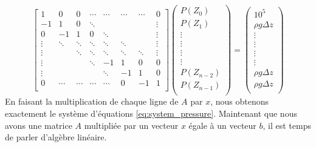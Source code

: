 \begin{equation}
\label{eq:ax_b}
\begin{bmatrix}
   1   &    0   &    0   & \cdots & \cdots & \cdots & \cdots &   0    \\
  -1   &    1   &    0   & \ddots &        &        &        & \vdots \\
   0   &   -1   &    1   &    0   & \ddots &        &        & \vdots \\
\vdots & \ddots & \ddots & \ddots & \ddots & \ddots &        & \vdots \\
\vdots &        & \ddots & \ddots & \ddots & \ddots & \ddots & \vdots \\
\vdots &        &        & \ddots &   -1   &    1   &    0   &   0    \\
\vdots &        &        &        & \ddots &   -1   &    1   &   0    \\
   0   & \cdots & \cdots & \cdots & \cdots &    0   &   -1   &   1    \\
\end{bmatrix}
\begin{pmatrix}
  P(Z_0)  \\
  P(Z_1)  \\
\vdots \\
\vdots \\
\vdots \\
\vdots \\
P(Z_{n-2}) \\
  P(Z_{n-1})  \\
\end{pmatrix}
=
\begin{pmatrix}
 10^5  \\
\rho{}g\Delta{z}     \\
\vdots \\
\vdots \\
\vdots \\
\vdots \\
\rho{}g\Delta{z} \\
\rho{}g\Delta{z}    \\
\end{pmatrix}
\end{equation}
En faisant la multiplication de chaque ligne de $A$ par $x$, nous obtenons exactement le système d'équations \eqref{eq:system_pressure}.
%
Maintenant que nous avons une matrice $A$ multipliée par un vecteur $x$ égale à un vecteur $b$, il est temps de parler d'algèbre linéaire.
